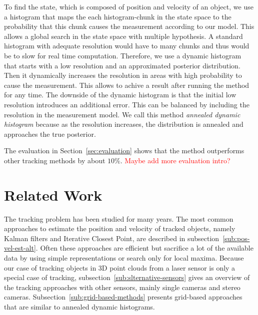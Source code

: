 \documentclass[twoside,a4paper,article]{combine}
\begin{document}
To find the state, which is composed of position and velocity of an
object, we use a histogram that maps the each histogram-chunk in the
state space to the probability that this chunk causes the measurement
according to our model. This allows a global search in the state space
with multiple hypothesis. A standard histogram with adequate
resolution would have to many chunks and thus would be to slow for
real time computation. Therefore, we use a dynamic histogram that
starts with a low resolution and an approximated posterior
distribution. Then it dynamically increases the resolution in areas
with high probability to cause the measurement. This allows to achive
a result after running the method for any time. The downside of the
dynamic histogram is that the initial low resolution introduces an
additional error. This can be balanced by including the resolution in
the measurement model. We call this method \textit{annealed dynamic
  histogram} because as the resolution increases, the distribution is
annealed and approaches the true posterior.

The evaluation in Section~\ref{sec:evaluation} shows that the method
outperforms other tracking methods by about $10\%$.
\textcolor{red}{Maybe add more evaluation intro?}

\section{Related Work}
\label{sec:related-work}
The tracking problem has been studied for many years. The most common
approaches to estimate the position and velocity of tracked objects,
namely Kalman filters and Iterative Closest Point,
are described in subsection~\ref{sub:pos-vel-est-alt}. Often these
approaches are efficient but sacrifice a lot of the available data by
using simple representations or search only for local maxima.
Because
our case of tracking objects in 3D point clouds from a laser sensor is
only a special case of tracking,
subsection~\ref{sub:slternative-sensors} gives an overview of the
tracking approaches with other sensors, mainly single cameras and
stereo cameras.
Subsection~\ref{sub:grid-based-methods} presents
grid-based approaches that are similar to annealed dynamic histograms.
\end{document}
